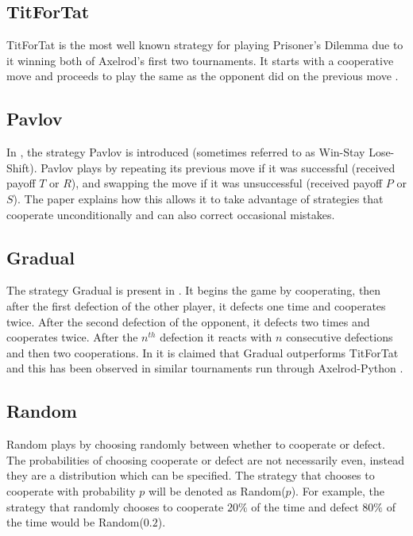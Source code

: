 \subsection{TitForTat}\label{ssec:stra_titfortat}
TitForTat is the most well known strategy for playing Prisoner's Dilemma due to it winning both of Axelrod's first two tournaments.
It starts with a cooperative move and proceeds to play the same as the opponent did on the previous move \cite{Axelrod1980b, Heap2003}.

\subsection{Pavlov}\label{ssec:strat_pavlov}
In \cite{Nowak1993}, the strategy Pavlov is introduced (sometimes referred to as Win-Stay Lose-Shift).
Pavlov plays by repeating its previous move if it was successful (received payoff $T$ or $R$), and swapping the move if it was unsuccessful (received payoff $P$ or $S$).
The paper explains how this allows it to take advantage of strategies that cooperate unconditionally and can also correct occasional mistakes.

\subsection{Gradual}\label{ssec:strat_gradual}
The strategy Gradual is present in \cite{Beaufils1997}.
It begins the game by cooperating, then after the first defection of the other player, it defects one time and cooperates twice.
After the second defection of the opponent, it defects two times and cooperates twice.
After the $n^{th}$ defection it reacts with $n$ consecutive defections and then two cooperations.
In \cite{Beaufils1997} it is claimed that Gradual outperforms TitForTat and this has been observed in similar tournaments run through Axelrod-Python \cite{axelrodproject}.


\subsection{Random}\label{ssec:strat_random}
Random plays  by choosing randomly between whether to cooperate or defect.
The probabilities of choosing cooperate or defect are not necessarily even, instead they are a distribution which can be specified.
The strategy that chooses to cooperate with probability $p$ will be denoted as Random($p$).
For example, the strategy that randomly chooses to cooperate $20\%$ of the time and defect $80\%$ of the time would be Random($0.2$).

